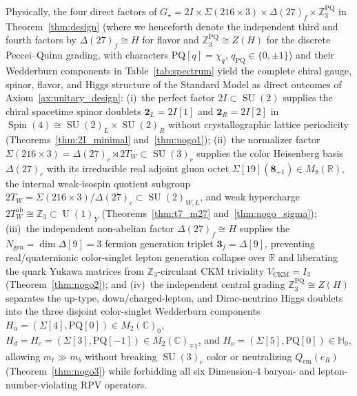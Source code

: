 \documentclass[11pt,a4paper]{article}
\theoremstyle{definition}
\theoremstyle{remark}
\newcommand{\R}{\mathbb{R}}
\newcommand{\C}{\mathbb{C}}
\newcommand{\quat}{\mathbb{H}}
\newcommand{\Z}{\mathbb{Z}}
\newcommand{\SU}{\operatorname{SU}}
\newcommand{\Spin}{\operatorname{Spin}}
\newcommand{\U}{\operatorname{U}}
\newcommand{\Gstar}{G_\star}
\begin{document}
Physically, the four direct factors of $\Gstar = 2I \times \Sigma(216 \times 3) \times \Delta(27)_f \times \Z_3^{\mathrm{PQ}}$ in Theorem~\ref{thm:design} (where we henceforth denote the independent third and fourth factors by $\Delta(27)_f \cong H$ for flavor and $\Z_3^{\mathrm{PQ}} \cong Z(H)$ for the discrete Peccei--Quinn grading, with characters $\mathrm{PQ}[q] = \chi_q$, $q_{\mathrm{PQ}} \in \{0, \pm 1\}$) and their Wedderburn components in Table~\ref{tab:spectrum} yield the complete chiral gauge, spinor, flavor, and Higgs structure of the Standard Model as direct outcomes of Axiom~\ref{ax:unitary_design}: (i)~the perfect factor $2I \subset \SU(2)$ supplies the chiral spacetime spinor doublets $\mathbf{2}_L = 2I[1]$ and $\mathbf{2}_R = 2I[2]$ in $\Spin(4) \cong \SU(2)_L \times \SU(2)_R$ without crystallographic lattice periodicity (Theorems~\ref{thm:2I_minimal} and~\ref{thm:nogo1}); (ii)~the normalizer factor $\Sigma(216 \times 3) = \Delta(27)_c \rtimes 2T_W \subset \SU(3)_c$ supplies the color Heisenberg basis $\Delta(27)_c$ with its irreducible real adjoint gluon octet $\Sigma[19](\mathbf{8}_{+1}) \in M_8(\R)$, the internal weak-isospin quotient subgroup $2T_W = \Sigma(216 \times 3)/\Delta(27)_c \subset \SU(2)_{W,L}$, and weak hypercharge $2T_W^{\mathrm{ab}} \cong \Z_3 \subset \U(1)_Y$ (Theorems~\ref{thm:t7_m27} and~\ref{thm:nogo_sigma}); (iii)~the independent non-abelian factor $\Delta(27)_f \cong H$ supplies the $N_{\mathrm{gen}} = \dim\Delta[9] = 3$ fermion generation triplet $\mathbf{3}_f = \Delta[9]$, preventing real/quaternionic color-singlet lepton generation collapse over $\R$ and liberating the quark Yukawa matrices from $\Z_3$-circulant CKM triviality $V_{\mathrm{CKM}} = I_3$ (Theorem~\ref{thm:nogo2}); and (iv)~the independent central grading $\Z_3^{\mathrm{PQ}} \cong Z(H)$ separates the up-type, down/charged-lepton, and Dirac-neutrino Higgs doublets into the three disjoint color-singlet Wedderburn components $H_u = (\Sigma[4], \mathrm{PQ}[0]) \in M_2(\C)_0$, $H_d = H_e = (\Sigma[3], \mathrm{PQ}[-1]) \in M_2(\C)_{\mp 1}$, and $H_\nu = (\Sigma[5], \mathrm{PQ}[0]) \in \quat_0$, allowing $m_t \gg m_b$ without breaking $\SU(3)_c$ color or neutralizing $Q_{\mathrm{em}}(e_R)$ (Theorem~\ref{thm:nogo3}) while forbidding all six Dimension-4 baryon- and lepton-number-violating RPV operators.
\end{document}
